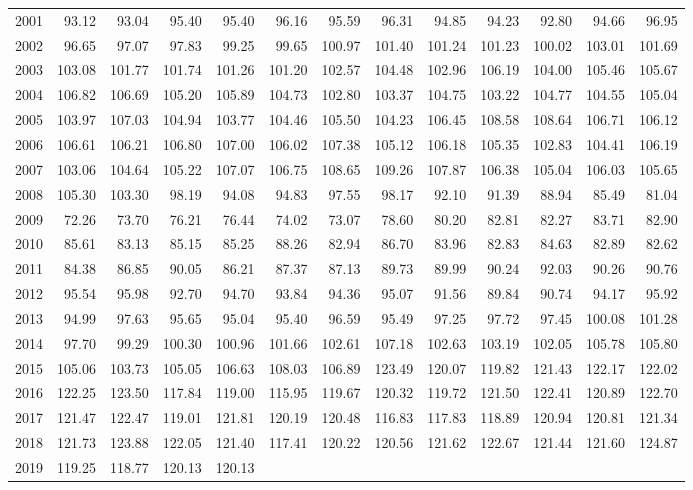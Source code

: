 \begin{longtable}{rrrrrrrrrrrrr}
  2001 & 93.12 & 93.04 & 95.40 & 95.40 & 96.16 & 95.59 & 96.31 & 94.85 & 94.23 & 92.80 & 94.66 & 96.95 \\ 
  2002 & 96.65 & 97.07 & 97.83 & 99.25 & 99.65 & 100.97 & 101.40 & 101.24 & 101.23 & 100.02 & 103.01 & 101.69 \\ 
  2003 & 103.08 & 101.77 & 101.74 & 101.26 & 101.20 & 102.57 & 104.48 & 102.96 & 106.19 & 104.00 & 105.46 & 105.67 \\ 
  2004 & 106.82 & 106.69 & 105.20 & 105.89 & 104.73 & 102.80 & 103.37 & 104.75 & 103.22 & 104.77 & 104.55 & 105.04 \\ 
  2005 & 103.97 & 107.03 & 104.94 & 103.77 & 104.46 & 105.50 & 104.23 & 106.45 & 108.58 & 108.64 & 106.71 & 106.12 \\ 
  2006 & 106.61 & 106.21 & 106.80 & 107.00 & 106.02 & 107.38 & 105.12 & 106.18 & 105.35 & 102.83 & 104.41 & 106.19 \\ 
  2007 & 103.06 & 104.64 & 105.22 & 107.07 & 106.75 & 108.65 & 109.26 & 107.87 & 106.38 & 105.04 & 106.03 & 105.65 \\ 
  2008 & 105.30 & 103.30 & 98.19 & 94.08 & 94.83 & 97.55 & 98.17 & 92.10 & 91.39 & 88.94 & 85.49 & 81.04 \\ 
  2009 & 72.26 & 73.70 & 76.21 & 76.44 & 74.02 & 73.07 & 78.60 & 80.20 & 82.81 & 82.27 & 83.71 & 82.90 \\ 
  2010 & 85.61 & 83.13 & 85.15 & 85.25 & 88.26 & 82.94 & 86.70 & 83.96 & 82.83 & 84.63 & 82.89 & 82.62 \\ 
  2011 & 84.38 & 86.85 & 90.05 & 86.21 & 87.37 & 87.13 & 89.73 & 89.99 & 90.24 & 92.03 & 90.26 & 90.76 \\ 
  2012 & 95.54 & 95.98 & 92.70 & 94.70 & 93.84 & 94.36 & 95.07 & 91.56 & 89.84 & 90.74 & 94.17 & 95.92 \\ 
  2013 & 94.99 & 97.63 & 95.65 & 95.04 & 95.40 & 96.59 & 95.49 & 97.25 & 97.72 & 97.45 & 100.08 & 101.28 \\ 
  2014 & 97.70 & 99.29 & 100.30 & 100.96 & 101.66 & 102.61 & 107.18 & 102.63 & 103.19 & 102.05 & 105.78 & 105.80 \\ 
  2015 & 105.06 & 103.73 & 105.05 & 106.63 & 108.03 & 106.89 & 123.49 & 120.07 & 119.82 & 121.43 & 122.17 & 122.02 \\ 
  2016 & 122.25 & 123.50 & 117.84 & 119.00 & 115.95 & 119.67 & 120.32 & 119.72 & 121.50 & 122.41 & 120.89 & 122.70 \\ 
  2017 & 121.47 & 122.47 & 119.01 & 121.81 & 120.19 & 120.48 & 116.83 & 117.83 & 118.89 & 120.94 & 120.81 & 121.34 \\ 
  2018 & 121.73 & 123.88 & 122.05 & 121.40 & 117.41 & 120.22 & 120.56 & 121.62 & 122.67 & 121.44 & 121.60 & 124.87 \\ 
  2019 & 119.25 & 118.77 & 120.13 & 120.13 &  &  &  &  &  &  &  &  \\ 
   \hline
\hline
\end{longtable}
